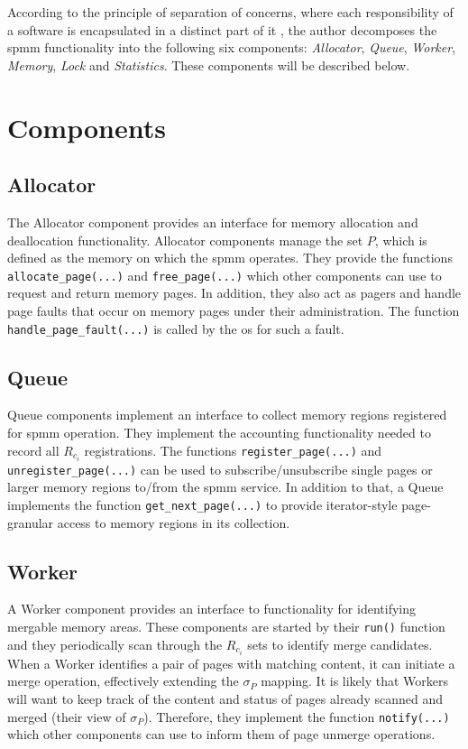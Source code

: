 According to the principle of separation of concerns, where each responsibility of a software is encapsulated in a distinct part of it \cite{soc1982}, the author decomposes the \ac{spmm} functionality into the following six components: \textit{Allocator},  \textit{Queue}, \textit{Worker}, \textit{Memory}, \textit{Lock} and \textit{Statistics}.
These components will be described below.

\section{Components}
\label{sec:components}

\subsection*{Allocator}
\label{subsec:allocator}

The Allocator component provides an interface for memory allocation and deallocation functionality.
Allocator components manage the set $P$, which is defined as the memory on which the \ac{spmm} operates.
They provide the functions \texttt{allocate\_page(...)} and \texttt{free\_page(...)} which other components can use to request and return memory pages.
In addition, they also act as pagers and handle page faults that occur on memory pages under their administration.
The function \texttt{handle\_page\_fault(...)} is called by the \ac{os} for such a fault.

\subsection*{Queue}
\label{subsec:queue}

Queue components implement an interface to collect memory regions registered for \ac{spmm} operation.
They implement the accounting functionality needed to record all $R_{c_i}$ registrations.
The functions \texttt{register\_page(...)} and \texttt{unregister\_page(...)} can be used to subscribe/unsubscribe single pages or larger memory regions to/from the \ac{spmm} service.
In addition to that, a Queue implements the function \texttt{get\_next\_page(...)} to provide iterator-style page-granular access to memory regions in its collection.

\subsection*{Worker}
\label{subsec:Worker}

A Worker component provides an interface to functionality for identifying mergable memory areas.
These components are started by their \texttt{run()} function and they periodically scan through the $R_{c_i}$ sets to identify merge candidates.
When a Worker identifies a pair of pages with matching content, it can initiate a merge operation, effectively extending the $\sigma_P$ mapping.
It is likely that Workers will want to keep track of the content and status of pages already scanned and merged (their view of $\sigma_P$).
Therefore, they implement the function \texttt{notify(...)} which other components can use to inform them of page unmerge operations.

